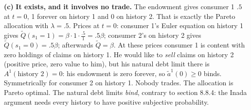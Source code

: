 \documentclass[12pt, letterpaper]{article}
\begin{document}
\begin{tcolorbox}[evenbox,title={Exercise 8.18 \quad Diverse beliefs, IV}]
\textbf{(c)} \textbf{It exists, and it involves no trade.} The endowment gives consumer 1 $.5$ at $t=0$, 1 forever on
history 1 and 0 on history 2. That is exactly the Pareto allocation with $\lambda=.5$. Prices at $t=0$: consumer 1's
Euler equation on history 1 gives $\tilde Q(s_1{=}1)=\beta\cdot1\cdot\frac{.5}{1}=.5\beta$; consumer 2's on history 2
gives $\tilde Q(s_1{=}0)=.5\beta$; afterwards $\tilde Q=\beta$. At these prices consumer 1 is content with zero
holdings of claims on history 1. He would like to \emph{sell} claims on history 2 (positive price, zero value to
him), but his natural debt limit there is $A^1(\text{history 2})=0$: his endowment is zero forever, so
$\tilde a^1(0)\ge0$ binds. Symmetrically for consumer 2 on history 1. Nobody trades. The allocation is Pareto
optimal. The natural debt limits \emph{bind}, contrary to section 8.8.4: the Inada argument needs every history
to have positive subjective probability.
\end{tcolorbox}
\end{document}

